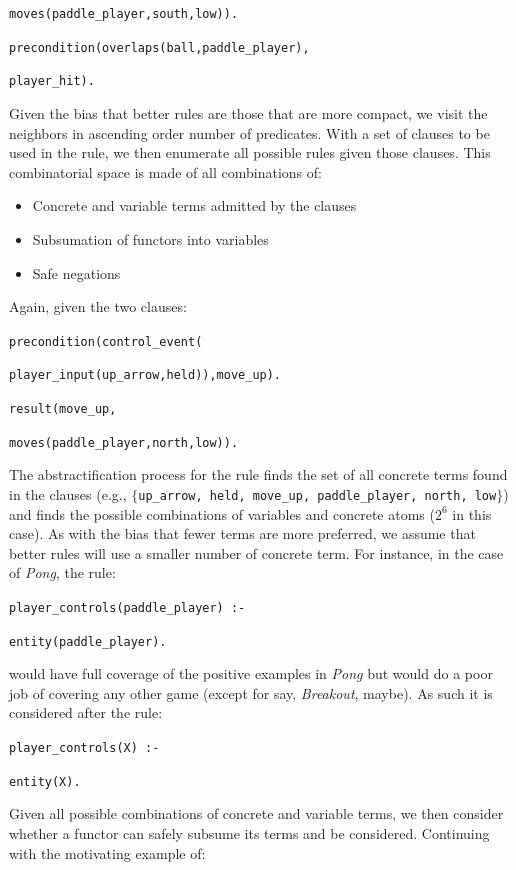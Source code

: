\documentclass[12pt]{report}
\begin{document}
\noindent \texttt{moves(paddle\_player,south,low)).}

\noindent \texttt{precondition(overlaps(ball,paddle\_player),}

\texttt{player\_hit).}

Given the bias that better rules are those that are more compact, we visit the neighbors in ascending order number of predicates. With a set of clauses to be used in the rule, we then enumerate all possible rules given those clauses. This combinatorial space is made of all combinations of:

\begin{itemize}
\item Concrete and variable terms admitted by the clauses
\item Subsumation of functors into variables
\item Safe negations
\end{itemize}

Again, given the two clauses:


\noindent \texttt{precondition(control\_event(}

\texttt{player\_input(up\_arrow,held)),move\_up).}

\noindent \texttt{result(move\_up,}

\texttt{moves(paddle\_player,north,low)).}

The abstractification process for the rule finds the set of all concrete terms found in the clauses (e.g., $\{$\texttt{up\_arrow, held, move\_up, paddle\_player, north, low}$\}$) and finds the possible  combinations of variables and concrete atoms ($2^6$ in this case). As with the bias that fewer terms are more preferred, we assume that better rules will use a smaller number of concrete term. For instance, in the case of \textit{Pong}, the rule:

\noindent \texttt{player\_controls(paddle\_player) :- }

\texttt{entity(paddle\_player).}

\noindent would have full coverage of the positive examples in \textit{Pong} but would do a poor job of covering any other game (except for say, \textit{Breakout}, maybe). As such it is considered after the rule:


\noindent \texttt{player\_controls(X) :- }

\texttt{entity(X).}

Given all possible combinations of concrete and variable terms, we then consider whether a functor can safely subsume its terms and be considered. Continuing with the motivating example of:
\end{document}
